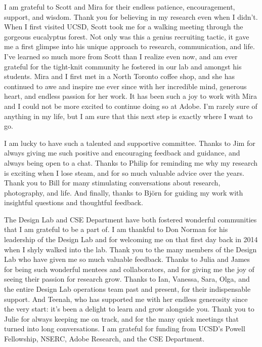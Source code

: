 I am grateful to Scott and Mira for their endless patience, encouragement, support, and wisdom. Thank you for believing in my research even when I didn't. When I first visited UCSD, Scott took me for a walking meeting through the gorgeous eucalyptus forest. Not only was this a genius recruiting tactic, it gave me a first glimpse into his unique approach to research, communication, and life. I've learned so much more from Scott than I realize even now, and am ever grateful for the tight-knit community he fostered in our lab and amongst his students. Mira and I first met in a North Toronto coffee shop, and she has continued to awe and inspire me ever since with her incredible mind, generous heart, and endless passion for her work. It has been such a joy to work with Mira and I could not be more excited to continue doing so at Adobe. I'm rarely sure of anything in my life, but I am sure that this next step is exactly where I want to go.

I am lucky to have such a talented and supportive committee. Thanks to Jim for always giving me such positive and encouraging feedback and guidance, and always being open to a chat. Thanks to Philip for reminding me why my research is exciting when I lose steam, and for so much valuable advice over the years. Thank you to Bill for many stimulating conversations about research, photography, and life. And finally, thanks to Björn for guiding my work with insightful questions and thoughtful feedback.

The Design Lab and CSE Department have both fostered wonderful communities that I am grateful to be a part of. I am thankful to Don Norman for his leadership of the Design Lab and for welcoming me on that first day back in 2014 when I shyly walked into the lab. Thank you to the many members of the Design Lab who have given me so much valuable feedback. Thanks to Julia and James for being such wonderful mentees and collaborators, and for giving me the joy of seeing their passion for research grow. Thanks to Ian, Vanessa, Sara, Olga, and the entire Design Lab operations team past and present, for their indispensable support. And Teenah, who has supported me with her endless generosity since the very start: it's been a delight to learn and grow alongside you. Thank you to Julie for always keeping me on track, and for the many quick meetings that turned into long conversations. 
I am grateful for funding from UCSD's Powell Fellowship, NSERC, Adobe Research, and the CSE Department.


